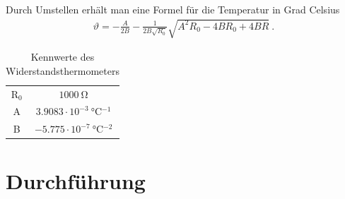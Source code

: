 \documentclass[12pt,a4paper,titlepage,headinclude,bibtotoc]{scrartcl}
\numberwithin{equation}{subsection}
\begin{document}
Durch Umstellen erhält man eine Formel für die Temperatur in Grad Celsius
\begin{align}
 \vartheta = -\frac{A}{2 B} - \frac{1}{2 B \sqrt{R_0}} \sqrt{A^2 R_0  - 4 B R_0 + 4 B R    }\label{eq:temperapt1000}~.
\end{align}

\begin{table}[!htb]
	\centering
	\begin{tabular}{|c|c|}
		\hline
		R$_0$ & $1000 ~ \si{\ohm}$\\
		A   & $3.9083 \cdot 10^{-3} ~ \si{\celsius^{-1}}$\\
		B   & $-5.775 \cdot 10^{-7} ~ \si{\celsius^{-2}}$\\
		\hline
	\end{tabular}
	\caption{Kennwerte des Widerstandsthermometers}
	\label{tab:Pt1000}
\end{table}
\section{Durchführung}
\label{sec:durchfuehrung}
\end{document}

